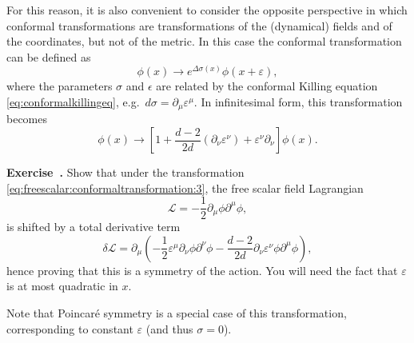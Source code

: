 \documentclass[a4paper,12pt]{article}
\newcommand{\Lagr}{\mathscr{L}}
\numberwithin{equation}{section}
\newcounter{exercise}[section]
\newenvironment{exercise}[1][]%
	{\refstepcounter{exercise}\bigskip
	\begin{mdframed}[backgroundcolor=gray!20, linewidth=0]
	\noindent\textbf{Exercise~\thesection.\theexercise #1} \rmfamily}
  	{\end{mdframed}\bigskip}
\begin{document}
For this reason, it is also convenient to consider the opposite perspective in which conformal transformations are transformations of the (dynamical) fields and of the coordinates, but not of the metric. In this case the conformal transformation can be defined as
\begin{equation}
	\phi(x) \to e^{\Delta \sigma(x)} \phi(x + \varepsilon),
\end{equation}
where the parameters $\sigma$ and $\epsilon$ are related by the conformal Killing equation \eqref{eq:conformalkillingeq}, e.g.~$d \sigma = \partial_\mu \varepsilon^\mu$. 
In infinitesimal form, this transformation becomes
\begin{equation}
	\phi(x) \to \left[ 1
	+ \frac{d-2}{2d} (\partial_\nu \varepsilon^\nu)
	+ \varepsilon^\nu \partial_\nu \right] \phi(x).
	\label{eq:freescalar:conformaltransformation:3}
\end{equation}
%
\begin{exercise}
	Show that under the transformation
	\eqref{eq:freescalar:conformaltransformation:3},
	the free scalar field Lagrangian
	$$
	\Lagr = - \frac{1}{2} \partial_\mu \phi \partial^\mu \phi,
	$$
	is shifted by a total derivative term
	$$
	\delta\Lagr = \partial_\mu \left( 
	- \frac{1}{2} \varepsilon^\mu \partial_\nu \phi \partial^\nu \phi
	- \frac{d-2}{2d} \partial_\nu \varepsilon^\nu
	\phi \partial^\mu \phi \right),
	$$
	hence proving that this is a symmetry of the action.
	You will need the fact that $\varepsilon$ is at most quadratic
	in $x$.
\end{exercise}
Note that Poincaré symmetry is a special case of this transformation, corresponding to constant $\varepsilon$ (and thus $\sigma = 0$).
\end{document}
